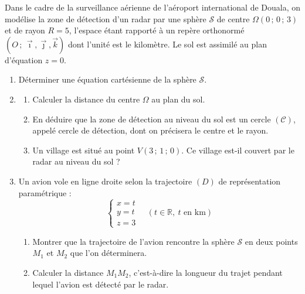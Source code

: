 \documentclass[11pt]{article}
\begin{document}
\begin{exercice}
Dans le cadre de la surveillance aérienne de l'aéroport international de Douala, on modélise la zone de détection d'un radar par une sphère $\mathcal{S}$ de centre $\Omega(0\,;\,0\,;\,3)$ et de rayon $R=5$, l'espace étant rapporté à un repère orthonormé $(O\,;\,\vec{\imath},\vec{\jmath},\vec{k})$ dont l'unité est le kilomètre. Le sol est assimilé au plan d'équation $z=0$.
\begin{enumerate}
\item Déterminer une équation cartésienne de la sphère $\mathcal{S}$.
\item 
\begin{enumerate}
\item Calculer la distance du centre $\Omega$ au plan du sol.
\item En déduire que la zone de détection au niveau du sol est un cercle $(\mathcal{C})$, appelé cercle de détection, dont on précisera le centre et le rayon.
\item Un village est situé au point $V(3\,;\,1\,;\,0)$. Ce village est-il couvert par le radar au niveau du sol ?
\end{enumerate}
\item Un avion vole en ligne droite selon la trajectoire $(D)$ de représentation paramétrique :
\[
\begin{cases}
x=t\\
y=t\\
z=3
\end{cases}\quad (t\in\mathbb{R},\ t\text{ en km})
\]
\begin{enumerate}
\item Montrer que la trajectoire de l'avion rencontre la sphère $\mathcal{S}$ en deux points $M_1$ et $M_2$ que l'on déterminera.
\item Calculer la distance $M_1M_2$, c'est-à-dire la longueur du trajet pendant lequel l'avion est détecté par le radar.
\end{enumerate}
\end{enumerate}
\end{exercice}
\end{document}
